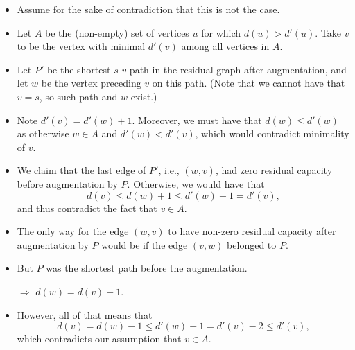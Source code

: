 \documentclass{article}
\begin{document}
\begin{itemize}
\begin{itemize}
\item Assume for the sake of contradiction that this is not the case. 
\item Let $A$ be the (non-empty) set of vertices $u$ for which $d(u)>d'(u)$. Take $v$ to be the vertex with minimal $d'(v)$ among all vertices in $A$. 
\item Let $P'$ be the shortest $s$-$v$ path in the residual graph after augmentation, and let $w$ be the vertex preceding $v$ on this path. (Note that we cannot have that $v=s$, so such path and $w$ exist.)
\item Note $d'(v)=d'(w)+1$. Moreover, we must have that $d(w)\leq d'(w)$ as otherwise $w\in A$ and $d'(w)<d'(v)$, which would contradict minimality of $v$. 
\item We claim that the last edge of $P'$, i.e., $(w,v)$, had zero residual capacity before augmentation by $P$. Otherwise, we would have that 
\[
d(v)\leq d(w)+1 \leq d'(w)+1 = d'(v),
\]
and thus contradict the fact that $v\in A$. 
\item The only way for the edge $(w,v)$ to have non-zero residual capacity after augmentation by $P$ would be if the edge $(v,w)$ belonged to $P$. 

\item But $P$ was the shortest path before the augmentation. 

$\Rightarrow$ $d(w)=d(v)+1$. 

\item However, all of that means that 
\[
d(v)=d(w)-1\leq d'(w)-1=d'(v)-2\leq d'(v),
\]
which contradicts our assumption that $v\in A$.
\end{itemize} 


\end{itemize}
\end{document}
